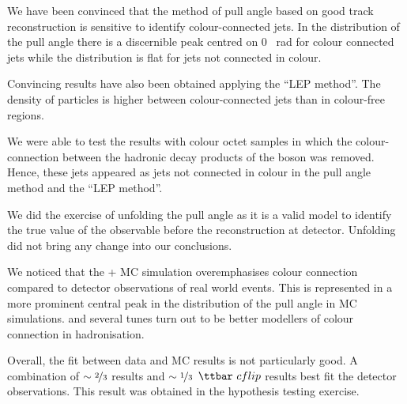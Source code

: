 We have been convinced that the method of pull angle based on good track reconstruction is sensitive to identify colour-connected jets. In the distribution of the pull angle there is a discernible peak centred on 0 ~rad for colour connected jets while the distribution is flat for jets not connected in colour.

Convincing results have also been obtained applying the ``LEP method''. The density of particles is higher between colour-connected jets than in colour-free regions.

We were able to test the results with \PW colour octet samples in which the colour-connection between the hadronic decay products of the \PW boson was removed. Hence, these jets appeared as jets not connected in colour in the pull angle method and the ``LEP method''.

We did the exercise of unfolding the pull angle as it is a valid model to identify the true value of the observable before the reconstruction at detector. Unfolding did not bring any change into our conclusions.

We noticed that the \POWHEG + \PYTHIA MC simulation overemphasises colour connection compared to detector observations of real world events. This is represented in a more prominent central peak in the distribution of the pull angle in MC simulations. \HERWIGpp and several \PYTHIA tunes turn out to be better modellers of colour connection in hadronisation.

Overall, the fit between data and MC results is not particularly good. A combination of $\sim\nicefrac{2}{3}$ \ttbar results and $\sim\nicefrac{1}{3}$ $\ttbar\ cflip$ results best fit the detector observations. This result was obtained in the hypothesis testing exercise.
